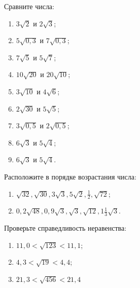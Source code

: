 \documentclass[algebra,a5paper]{pum}
\date{07.04.20}
\begin{document}
\begin{exercises}
  \begin{question}
    Сравните числа:
    \begin{enumerate}[label=\arabic*)]
        \item $3\sqrt{2}$ и $2\sqrt{3}$;
        \item $5\sqrt{0,3}$ и $7\sqrt{0,3}$;
        \item $7\sqrt{5}$ и $5\sqrt{7}$;
        \item $10\sqrt{20}$ и $20\sqrt{10}$;
        \item $3\sqrt{10}$ и $4\sqrt{6}$;
        \item $2\sqrt{30}$ и $5\sqrt{5}$;
        \item $3\sqrt{0,5}$ и $2\sqrt{0,5}$;
        \item $6\sqrt{3}$ и $5\sqrt{4}$;
        \item $6\sqrt{3}$ и $5\sqrt{4}$.
      \end{enumerate}
  \end{question}
  \begin{question}
    Расположите в порядке возрастания числа:
    \begin{enumerate}[label=\arabic*)]
      \item $\sqrt{32}, \sqrt{30}, 3\sqrt{3}, 5\sqrt{2},\frac{1}{2},\sqrt{72}$;
      \item $0,2\sqrt{48}, 0,9\sqrt{3},\sqrt{3}, \sqrt{12}, 1\frac{1}{3}\sqrt{3}$.
    \end{enumerate}
  \end{question}
  \begin{question}
    Проверьте справедливость неравенства:
    \begin{enumerate}[label=\arabic*)]
    \item $11,0<\sqrt{123}<11,1$; 
      \item $4,3<\sqrt{19}<4,4$;
      \item $21,3<\sqrt{456}<21,4$
    \end{enumerate}
  \end{question}
\end{exercises}
\end{document}
